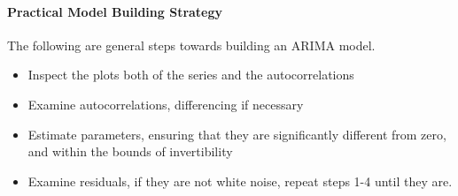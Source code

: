 


\paragraph{Practical Model Building Strategy}

The following are general steps towards building an ARIMA model.

\begin{itemize}
\item Inspect the plots both of the series and the autocorrelations
\item Examine autocorrelations, differencing if necessary
\item Estimate parameters, ensuring that they are significantly different from zero, and within the bounds of invertibility
\item Examine residuals, if they are not white noise, repeat steps 1-4 until they are.
\end{itemize}

